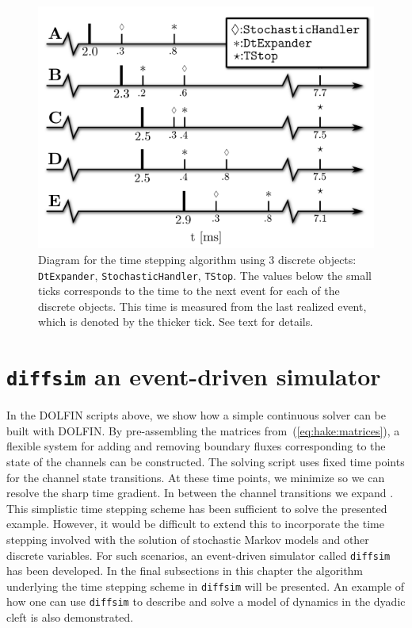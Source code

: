 \begin{figure}
  \centering
  \includegraphics[width=\smallfig]{chapters/hake/pdf/timeline}
  \caption[Time stepping algorithm]{Diagram for the time stepping
    algorithm using 3 discrete objects: \texttt{DtExpander},
    \texttt{StochasticHandler}, \texttt{TStop}. The values below the
    small ticks corresponds to the time to the next event for each of
    the discrete objects. This time is measured from the last realized
    event, which is denoted by the thicker tick. See text for details.}
  \label{fig:hake:time-line}
\end{figure}

\section{\texttt{diffsim} an event-driven simulator}
\label{sec:hake:diffsim}
   In
the DOLFIN scripts above, we show how a simple continuous solver can
be built with DOLFIN. By pre-assembling the matrices
from~(\ref{eq:hake:matrices}), a flexible system for adding and
removing boundary fluxes corresponding to the state of the channels
can be constructed. The solving script uses fixed time points for the
channel state transitions. At these time points, we minimize \Dt so we
can resolve the sharp time gradient. In between the channel
transitions we expand \Dt. This simplistic time stepping scheme has
been sufficient to solve the presented example. However, it would be
difficult to extend this to incorporate the time stepping involved
with the solution of stochastic Markov models and other discrete
variables. For such scenarios, an event-driven simulator called
\texttt{diffsim} has been developed. In the final subsections in this
chapter the algorithm underlying the time stepping scheme in
\texttt{diffsim} will be presented. An example of how one can use
\texttt{diffsim} to describe and solve a model of \Ca dynamics in the
dyadic cleft is also demonstrated.

